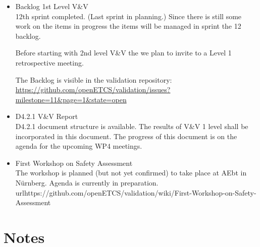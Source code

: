 \documentclass[a4paper, 11pt]{article}
\begin{document}
\begin{itemize}
\item Backlog 1st Level V\&V\\
12th sprint completed. (Last sprint in planning.) Since there is still some work on the items in progress the items will be managed in sprint the 12 backlog. 

Before starting with 2nd level V\&V the we plan to invite to a Level 1 retrospective meeting.

The Backlog is visible in the validation repository:
\url{https://github.com/openETCS/validation/issues?milestone=11&page=1&state=open}\\

\item D4.2.1 V\&V Report\\
D4.2.1 document structure is available. The results of V\&V 1 level shall be incorporated in this document. The progress of this document is on the agenda for the upcoming WP4 meetings.

\item First Workshop on Safety Assessment\\
The workshop is planned (but not yet confirmed) to take place at AEbt in N\"urnberg. Agenda is currently in preparation. url{https://github.com/openETCS/validation/wiki/First-Workshop-on-Safety-Assessment}

\end{itemize}


\section{Notes}
\end{document}
